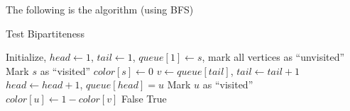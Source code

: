                 The following is the algorithm (using BFS)
                \begin{algorithm}[H]
                    \caption{Test Bipartiteness}
                    \begin{algorithmic}[1]
                        \State Initialize, $head \gets 1$, $tail \gets 1$, $queue[1] \gets s$, mark all vertices as ``unvisited''
                        \State Mark $s$ as ``visited''
                        \State $color[s] \gets 0$
                            \State $v \gets queue[tail]$, $tail \gets tail + 1$
                                    \State $head \gets head + 1$, $queue[head] = u$
                                    \State Mark $u$ as ``visited''
                                    \State $color[u] \gets 1 - color[v]$
                                \Else
                                        \Return False
                                    \EndIf
                                \EndIf
                            \EndFor
                        \EndWhile
                        \Return True
                    \end{algorithmic}
                \end{algorithm}

